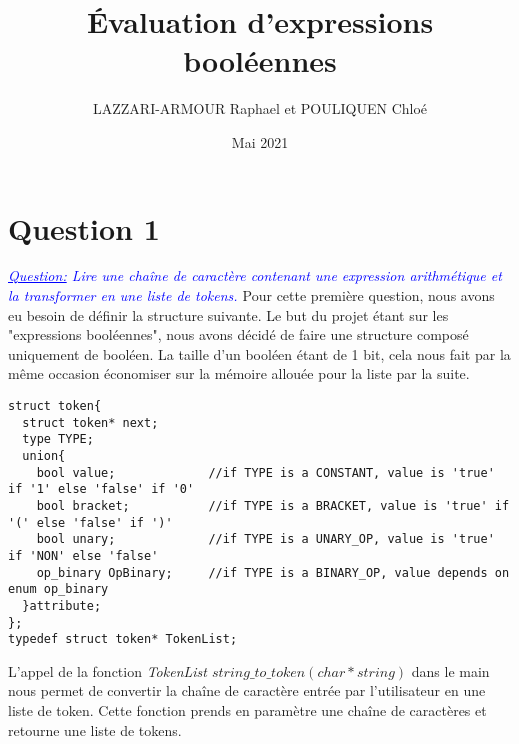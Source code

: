 \documentclass{article}
\title{Évaluation d’expressions booléennes}
\author{LAZZARI-ARMOUR Raphael et POULIQUEN Chloé}
\date{Mai 2021}
\begin{document}
\maketitle

\section{Question 1}
\textit{
\textcolor{blue}{
\underline{Question:}
 Lire une chaîne de caractère contenant une expression arithmétique et la transformer en une liste de tokens.
}
}
\newline\newline
Pour cette première question, nous avons eu besoin de définir la structure suivante. Le but du projet étant sur les "expressions booléennes", nous avons décidé de faire une structure composé uniquement de booléen. La taille d'un booléen étant de 1 bit, cela nous fait par la même occasion économiser sur la mémoire allouée pour la liste par la suite. 

\begin{verbatim}
struct token{
  struct token* next;
  type TYPE;
  union{
    bool value;             //if TYPE is a CONSTANT, value is 'true' if '1' else 'false' if '0'
    bool bracket;           //if TYPE is a BRACKET, value is 'true' if '(' else 'false' if ')'
    bool unary;             //if TYPE is a UNARY_OP, value is 'true' if 'NON' else 'false'
    op_binary OpBinary;     //if TYPE is a BINARY_OP, value depends on enum op_binary
  }attribute;
};
typedef struct token* TokenList;
\end{verbatim}

L'appel de la fonction \textit{TokenList $string\_to\_token(char* string)$} dans le main nous permet de convertir la chaîne de caractère entrée par l'utilisateur en une liste de token. Cette fonction prends en paramètre une chaîne de caractères et retourne une liste de tokens. 
\end{document}
